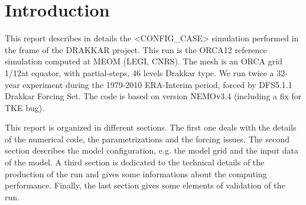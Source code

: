 \section*{Introduction}

This report describes in details the <CONFIG_CASE> simulation performed in the frame of the DRAKKAR project. 
This run is the ORCA12 reference simulation computed at MEOM (LEGI, CNRS). The mesh is an ORCA grid 1/12\degres \enspace at equator, 
with partial-steps, 46 levels Drakkar type. 
We run twice a 32-year experiment during the 1979-2010 ERA-Interim period, forced by DFS5.1.1 Drakkar Forcing Set.
The code is based on version NEMOv3.4 (including a fix for TKE bug).

This report is organized in different sections. The first one deals with the details of the numerical code, 
the parametrizations and the forcing issues. The second section describes the model configuration, 
e.g. the model grid and the input data of the model. A third section is dedicated to the technical details 
of the production of the run and gives some informations about the computing performance. Finally, the last 
section gives some elements of validation of the run.

